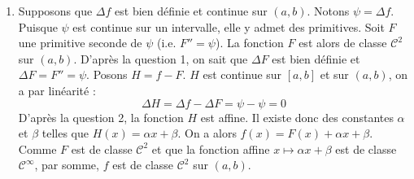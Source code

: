 \begin{solution}
\begin{enumerate}
        \item Supposons que $\Delta f$ est bien définie et continue sur $(a,b)$. Notons $\psi = \Delta f$.
        Puisque $\psi$ est continue sur un intervalle, elle y admet des primitives. Soit $F$ une primitive seconde de $\psi$ (i.e. $F'' = \psi$). 
        La fonction $F$ est alors de classe $\mathcal C^2$ sur $(a,b)$. 
        D'après la question 1, on sait que $\Delta F$ est bien définie et $\Delta F = F'' = \psi$.
        Posons $H = f - F$. $H$ est continue sur $[a,b]$ et sur $(a,b)$, on a par linéarité :
        \[
            \Delta H = \Delta f - \Delta F = \psi - \psi = 0
        \]
        D'après la question 2, la fonction $H$ est affine. Il existe donc des constantes $\alpha$ et $\beta$ telles que $H(x) = \alpha x + \beta$.
        On a alors $f(x) = F(x) + \alpha x + \beta$.
        Comme $F$ est de classe $\mathcal C^2$ et que la fonction affine $x \mapsto \alpha x + \beta$ est de classe $\mathcal C^\infty$, par somme, $f$ est de classe $\mathcal C^2$ sur $(a,b)$.
    \end{enumerate}
\end{solution}